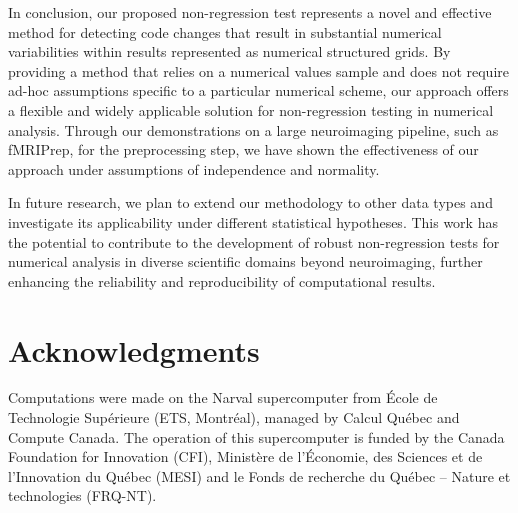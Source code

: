 \documentclass{article}
\newcommand{\fmriprep}{fMRIPrep\xspace}
\begin{document}
In conclusion, our proposed non-regression test represents a novel and effective method for detecting code changes that result in substantial numerical variabilities within results represented as numerical structured grids. By providing a method that relies on a numerical values sample and does not require ad-hoc assumptions specific to a particular numerical scheme, our approach offers a flexible and widely applicable solution for non-regression testing in numerical analysis.
Through our demonstrations on a large neuroimaging pipeline, such as \fmriprep, for the preprocessing step, we have shown the effectiveness of our approach under assumptions of independence and normality.

In future research, we plan to extend our methodology to other data types and investigate its applicability under different statistical hypotheses. This work has the potential to contribute to the development of robust non-regression tests for numerical analysis in diverse scientific domains beyond neuroimaging, further enhancing the reliability and reproducibility of computational results.

\section{Acknowledgments}

Computations were made on the Narval supercomputer from \'Ecole de Technologie
Sup\'erieure (ETS, Montr\'eal), managed by Calcul Québec and Compute Canada. The
operation of this supercomputer is funded by the Canada Foundation for
Innovation (CFI), Ministère de l’Économie, des Sciences et de l’Innovation du
Québec (MESI) and le Fonds de recherche du Québec – Nature et technologies
(FRQ-NT).
\end{document}

